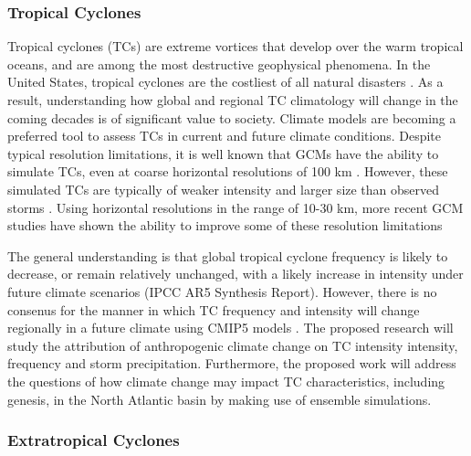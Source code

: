 \documentclass[11pt]{article}
\begin{document}
\subsubsection{Tropical Cyclones}
Tropical cyclones (TCs) are extreme vortices that develop over the warm tropical oceans, and are among the most destructive geophysical phenomena. In the United States, tropical cyclones are the costliest of all natural disasters \citep{Pielke1998}. As a result, understanding how global and regional TC climatology will change in the coming decades is of significant value to society. Climate models are becoming a preferred tool to assess TCs in current and future climate conditions. Despite typical resolution limitations, it is well known that GCMs have the ability to simulate TCs, even at coarse horizontal resolutions of 100 km \citep{Knutson2010}. However, these simulated TCs are typically of weaker intensity and larger size than observed storms \citep{Walsh2007}. Using horizontal resolutions in the range of 10-30 km, more recent GCM studies have shown the ability to improve some of these resolution limitations \citep{Murakami2012,Manganello2012, Bacmeister2014, Wehner2014}

The general understanding is that global tropical cyclone frequency is likely to decrease, or remain relatively unchanged, with a likely increase in intensity under future climate scenarios {\color{red}(IPCC AR5 Synthesis Report)}. However, there is no consenus for the manner in which TC frequency and intensity will change regionally in a future climate using CMIP5 models \citep{Camargo2013}. The proposed research will study the attribution of anthropogenic climate change on TC intensity intensity, frequency and storm precipitation. Furthermore, the proposed work will address the questions of how climate change may impact TC characteristics, including genesis, in the North Atlantic basin by making use of ensemble simulations.  

\subsubsection{Extratropical Cyclones}
\end{document}
